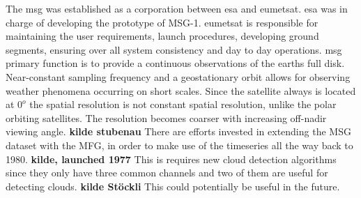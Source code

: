 The \acrfull{msg} was established as a corporation between \acrfull{esa} and \acrfull{eumetsat}. \acrshort{esa} was in charge of developing the prototype of MSG-1. \acrshort{eumetsat} is responsible for maintaining the user requirements, launch procedures, developing ground segments, ensuring over all system consistency and day to day operations.  \acrshort{msg} primary function is to provide a continuous observations of the earths full disk. Near-constant sampling frequency and a geostationary orbit allows for observing weather phenomena occurring on short scales. Since the satellite always is located at $0^o$ the spatial resolution is not constant spatial resolution, unlike the polar orbiting satellites. The resolution becomes coarser with increasing off-nadir viewing angle. \textbf{kilde stubenau} There are efforts invested in extending the MSG dataset with the MFG, in order to make use of the timeseries all the way back to 1980. \textbf{kilde, launched 1977} This is requires new cloud detection algorithms since they only have three common channels and two of them are useful for detecting clouds. \textbf{kilde Stöckli} This could potentially be useful in the future. 

